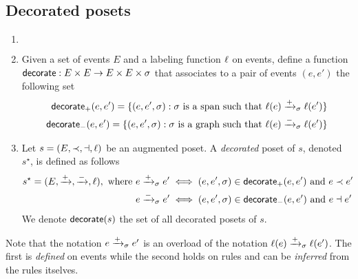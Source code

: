 \subsection{Decorated posets}

\begin{definition}
  \label{def:decorate_poset}
  \begin{enumerate}
  \item[] $~$
  \item Given a set of events $E$ and a labeling function $\ell$ on events, define a function $\mathsf{decorate}:E\times E \to E\times E\times \sigma$ that associates to a pair of events $(e,e')$ the following set
    \begin{align*}
      \mathsf{decorate}_{+}(e,e') = \{(e,e',\sigma) : \sigma\text{ is a span such that }\ell(e)\mathrel{\xrightarrow{+}}_{\sigma} \ell(e')\}\\
       \mathsf{decorate}_{-}(e,e') = \{(e,e',\sigma) : \sigma\text{ is a graph such that }\ell(e)\mathrel{\xrightarrow{-}}_{\sigma} \ell(e')\}
    \end{align*}

  \item Let $s = (E,\prec,\dashv,\ell)$ be an augmented poset. A \emph{decorated} poset of $s$, denoted $s^{\star}$, is defined as follows
    \begin{align*}
      s^{\star} = (E,\mathrel{\xrightarrow{+}},\mathrel{\xrightarrow{-}},\ell), \text{ where }
      &e\mathrel{\xrightarrow{+}}_{\sigma} e' \iff (e,e',{\sigma})\in\mathsf{decorate}_+(e,e')\text{ and }e\prec e'\\
      &e\mathrel{\xrightarrow{-}}_{\sigma} e' \iff (e,e',{\sigma})\in\mathsf{decorate}_-(e,e')\text{ and }e\dashv e'\\
    \end{align*}
    We denote $\mathsf{decorate}(s)$ the set of all decorated posets of $s$.
  \end{enumerate}
\end{definition}

Note that the notation $e\mathrel{\xrightarrow{+}}_{\sigma} e'$ is an overload of the notation $\ell(e)\mathrel{\xrightarrow{+}}_{\sigma} \ell(e')$. The first is \emph{defined} on events while the second holds on rules and can be \emph{inferred} from the rules itselves.

